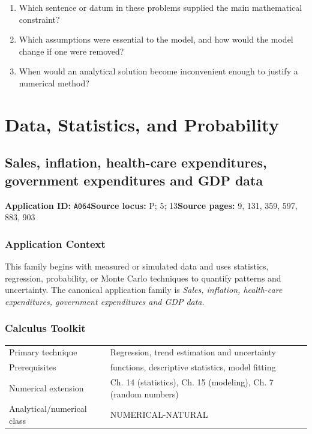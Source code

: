 \documentclass[11pt]{book}
\newcommand{\pid}[1]{\texttt{#1}}
\begin{document}
\begin{reflectionbox}\begin{enumerate}
\item Which sentence or datum in these problems supplied the main mathematical constraint?
\item Which assumptions were essential to the model, and how would the model change if one were removed?
\item When would an analytical solution become inconvenient enough to justify a numerical method?
\end{enumerate}\end{reflectionbox}
\part{Data, Statistics, and Probability}
\chapter{Sales, inflation, health-care expenditures, government expenditures and GDP data}\label{app:A064}
\textbf{Application ID:} \pid{A064}\quad \textbf{Source locus:} P; 5; 13\quad \textbf{Source pages:} 9, 131, 359, 597, 883, 903
\section*{Application Context}
This family begins with measured or simulated data and uses statistics, regression, probability, or Monte Carlo techniques to quantify patterns and uncertainty. The canonical application family is \emph{Sales, inflation, health-care expenditures, government expenditures and GDP data}.
\section*{Calculus Toolkit}
\begin{tabularx}{\textwidth}{@{}lX@{}}\toprule
Primary technique & Regression, trend estimation and uncertainty \\
Prerequisites & functions, descriptive statistics, model fitting \\
Numerical extension & Ch. 14 (statistics), Ch. 15 (modeling), Ch. 7 (random numbers) \\
Analytical/numerical class & NUMERICAL-NATURAL \\
\bottomrule\end{tabularx}
\end{document}
